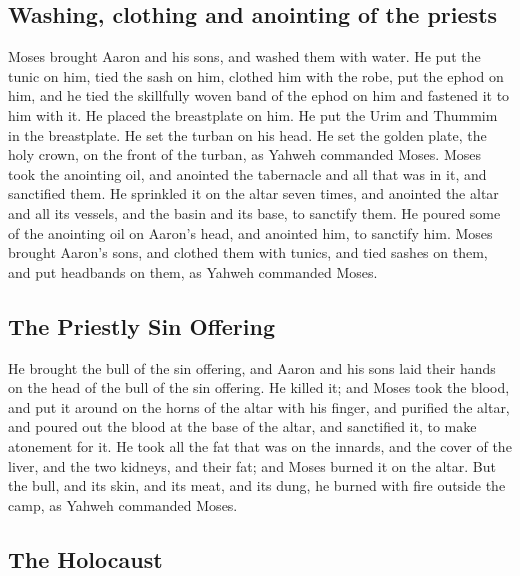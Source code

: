 \hypertarget{washing-clothing-and-anointing-of-the-priests}{%
\subsection{Washing, clothing and anointing of the
priests}\label{washing-clothing-and-anointing-of-the-priests}}

 Moses brought Aaron and his sons, and washed them with
water.  He put the tunic on him, tied the sash on him,
clothed him with the robe, put the ephod on him, and he tied the
skillfully woven band of the ephod on him and fastened it to him with
it.  He placed the breastplate on him. He put the Urim and
Thummim in the breastplate.  He set the turban on his
head. He set the golden plate, the holy crown, on the front of the
turban, as Yahweh commanded Moses.  Moses took the
anointing oil, and anointed the tabernacle and all that was in it, and
sanctified them.  He sprinkled it on the altar seven
times, and anointed the altar and all its vessels, and the basin and its
base, to sanctify them.  He poured some of the anointing
oil on Aaron's head, and anointed him, to sanctify him. 
Moses brought Aaron's sons, and clothed them with tunics, and tied
sashes on them, and put headbands on them, as Yahweh commanded Moses.

\hypertarget{the-priestly-sin-offering}{%
\subsection{The Priestly Sin Offering}\label{the-priestly-sin-offering}}

 He brought the bull of the sin offering, and Aaron and
his sons laid their hands on the head of the bull of the sin offering.
 He killed it; and Moses took the blood, and put it
around on the horns of the altar with his finger, and purified the
altar, and poured out the blood at the base of the altar, and sanctified
it, to make atonement for it.  He took all the fat that
was on the innards, and the cover of the liver, and the two kidneys, and
their fat; and Moses burned it on the altar.  But the
bull, and its skin, and its meat, and its dung, he burned with fire
outside the camp, as Yahweh commanded Moses.

\hypertarget{the-holocaust}{%
\subsection{The Holocaust}\label{the-holocaust}}

